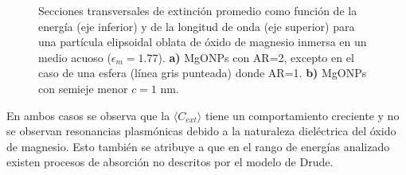 \begin{figure}[H]
	\quad%
	\caption{Secciones transversales de extinción promedio como función de la energía (eje inferior) y de la longitud de onda (eje superior) para una partícula elipsoidal oblata de óxido de magnesio inmersa en un medio acuoso ($\epsilon_m=1.77$). \textbf{a)} MgONPs con AR=2, excepto en el caso de una esfera (línea gris punteada) donde AR=1. \textbf{b)}  MgONPs con semieje menor $c=1$ nm.}\label{mgo}
\end{figure}

En ambos casos se observa que la $\langle C_{ext}\rangle$ tiene un comportamiento creciente y no se observan resonancias plasmónicas debido a la naturaleza dieléctrica del óxido de magnesio. Esto también se atribuye a que en el rango de energías analizado existen procesos de absorción no descritos por el modelo de Drude.









